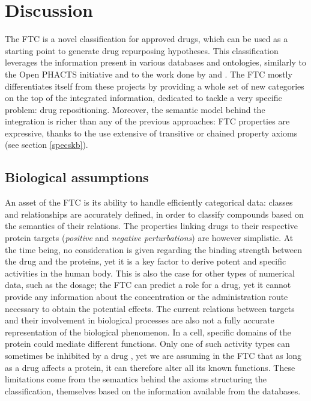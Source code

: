 \section{Discussion}
The FTC is a novel classification for approved drugs, which can be used as a starting point to generate drug repurposing hypotheses. This classification leverages the information present in various databases and ontologies, similarly to the Open PHACTS initiative \citep{williams2012open} and to the work done by \cite{hoehndorf2012identifying} and \cite{jupp2012logical}. The FTC mostly differentiates itself from these projects by providing a whole set of new categories on the top of the integrated information, dedicated to tackle a very specific problem: drug repositioning. Moreover, the semantic model behind the integration is richer than any of the previous approaches: FTC properties are expressive, thanks to the use extensive of transitive or chained property axioms (see section \ref{specskb}).

\subsection{Biological assumptions}
An asset of the FTC is its ability to handle efficiently categorical data: classes and relationships are accurately defined, in order to classify compounds based on the semantics of their relations. The properties linking drugs to their respective protein targets (\emph{positive} and \emph{negative perturbations}) are however simplistic. At the time being, no consideration is given regarding the binding strength between the drug and the proteins, yet it is a key factor to derive potent and specific activities in the human body. This is also the case for other types of numerical data, such as the dosage; the FTC can predict a role for a drug, yet it cannot provide any information about the concentration or the administration route necessary to obtain the potential effects. The current relations between targets and their involvement in biological processes are also not a fully accurate representation of the biological phenomenon. In a cell, specific domains of the protein could mediate different functions. Only one of such activity types can sometimes be inhibited by a drug \citep{kruger2012mapping}, yet we are assuming in the FTC that as long as a drug affects a protein, it can therefore alter all its known functions. These limitations come from the semantics behind the axioms structuring the classification, themselves based on the information available from the databases.

